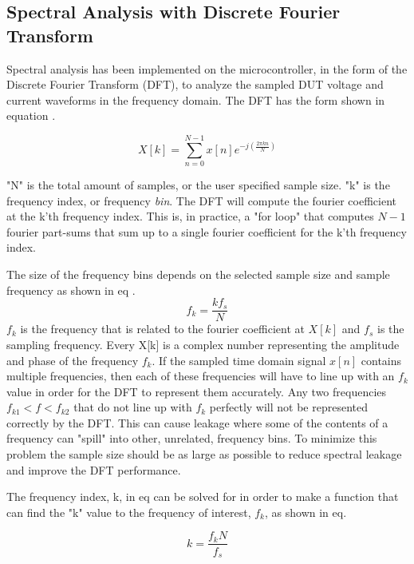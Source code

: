 \subsection{Spectral Analysis with Discrete Fourier Transform} \label{subsec:SpectralAnalysis} 

Spectral analysis has been implemented on the microcontroller, in the form of the Discrete Fourier Transform (DFT), to analyze the sampled DUT voltage and current waveforms in the frequency domain. The DFT has the form shown in equation .

\begin{equation}\label{eq:4_7_2_SA1}
    X[k] = \sum_{n=0}^{N-1} x[n] e^{-j(\frac{2\pi kn}{N})}
\end{equation}

"N" is the total amount of samples, or the user specified sample size. "k" is the frequency index, or frequency \textit{bin}. The DFT will compute the fourier coefficient at the k'th frequency index. This is, in practice, a "for loop" that computes $N-1$ fourier part-sums that sum up to a single fourier coefficient for the k'th frequency index.

The size of the frequency bins depends on the selected sample size and sample frequency as shown in eq .
\begin{equation}\label{eq:4_7_2_SA3}
    f_k = \frac{kf_s}{N} 
\end{equation}
$f_k$ is the frequency that is related to the fourier coefficient at $X[k]$ and $f_s$ is the sampling frequency. Every X[k] is a complex number representing the amplitude and phase of the frequency $f_k$. If the sampled time domain signal $x[n]$ contains multiple frequencies, then each of these frequencies will have to line up with an $f_k$ value in order for the DFT to represent them accurately. Any two frequencies $f_{k1} < f < f_{k2}$ that do not line up with $f_k$ perfectly will not be represented correctly by the DFT. This can cause leakage where some of the contents of a frequency can "spill" into other, unrelated, frequency bins. To minimize this problem the sample size should be as large as possible to reduce spectral leakage and improve the DFT performance.

The frequency index, k, in eq  can be solved for in order to make a function that can find the "k" value to the frequency of interest, $f_k$, as shown in eq.

\begin{equation}\label{eq:4_7_2_SA4}
    k = \frac{f_k N}{f_s} 
\end{equation}

